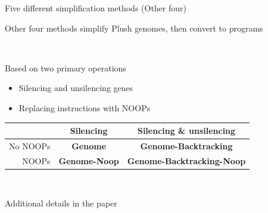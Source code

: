 \documentclass{beamer}
\begin{document}
\begin{frame}{Five different simplification methods (Other four)}

Other four methods simplify Plush genomes, then convert to programs

~

Based on two primary operations
\begin{itemize}
	\item Silencing and unsilencing genes
	\item Replacing instructions with NOOPs
\end{itemize}

\begin{center}
\begin{tabular}{r|cc} %
	&  Silencing & Silencing \& unsilencing \\ 
	\hline
	No NOOPs & \textbf{Genome} & \textbf{Genome-Backtracking} \\ 
	NOOPs & \textbf{Genome-Noop} & \textbf{Genome-Back\-tracking-Noop } \\ 
\end{tabular} 
\end{center}


~

Additional details in the paper

\end{frame}
\end{document}
